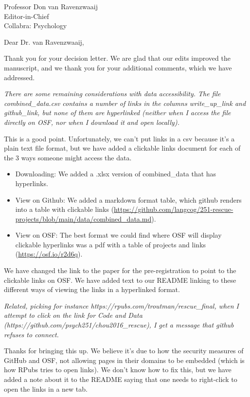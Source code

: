 \documentclass{stanfordletter}
\newcommand{\theysaid}[1]{\begin{leftbar} \noindent 
		\textsl{ #1}\end{leftbar}}
\begin{document}
	\signature{\vspace{-35pt} Veronica Boyce, \\ on behalf of the author team}
	
	
	\begin{letter}{Professor Don van Ravenzwaaij \\ Editor-in-Chief \\ Collabra: Psychology }
		
		
		\opening{Dear Dr. van Ravenzwaaij,} 
		
		Thank you for your decision letter. We are glad that our edits improved the manuscript, and we thank you for your additional comments, which we have addressed. 
		
		\theysaid{There are some remaining considerations with data accessibility. The file combined\_data.csv contains a number of links in the columns write\_up\_link and github\_link, but none of them are hyperlinked (neither when I access the file directly on OSF, nor when I download it and open locally).}
		
		This is a good point. Unfortunately, we can't put links in a csv because it's a plain text file format, but we have added a clickable links document for each of the 3 ways someone might access the data. 
		\begin{itemize}
			\item Downloading: We added a .xlsx version of combined\_data that has hyperlinks. 
			\item View on Github: We added a markdown format table, which github renders into a table with clickable links (\url{https://github.com/langcog/251-rescue-projects/blob/main/data/combined_data.md}).
			\item View on OSF: The best format we could find where OSF will display clickable hyperlinks was a pdf with a table of projects and links (\url{https://osf.io/r2d6q}). 
		\end{itemize}
		
	We have changed the link to the paper for the pre-registration to point to the clickable links on OSF. We have added text to our README linking to these different ways of viewing the links in a hyperlinked format.
	
	\theysaid{Related, picking for instance https://rpubs.com/troutman/rescue\_final, when I attempt to click on the link for Code and Data (https://github.com/psych251/chou2016\_rescue), I get a message that github refuses to connect.}
	
	Thanks for bringing this up. We believe it's due to how the security measures of GitHub and OSF, not allowing pages in their domains to be embedded (which is how RPubs tries to open links). We don't know how to fix this, but we have added a note about it to the README saying that one needs to right-click to open the links in a new tab. 
	

\end{letter}
\end{document}
